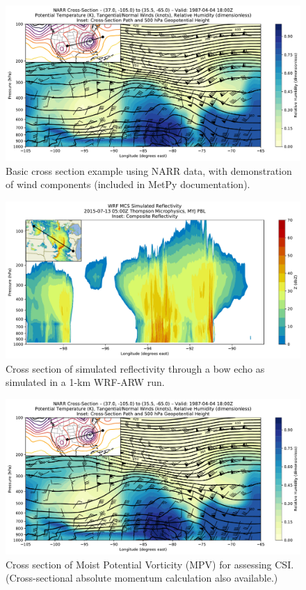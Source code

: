 \documentclass[final]{beamer}
\newlength{\colwidth}
\begin{document}
\begin{frame}[t, fragile]
\begin{columns}[t]
\begin{column}{\colwidth}
\begin{exampleblock}
    \begin{figure}
      \centering
      \includegraphics[width=\colwidth]{figures/basic_example_narr.pdf}
      \caption{Basic cross section example using NARR data, with demonstration of wind components (included in MetPy documentation).}
    \end{figure}
    \begin{figure}
      \centering
      \includegraphics[width=\colwidth]{figures/wrf_refl.pdf}
      \caption{Cross section of simulated reflectivity through a bow echo as simulated in a 1-km WRF-ARW run.}
    \end{figure}
    \begin{figure}
      \centering
      \includegraphics[width=\colwidth]{figures/basic_example_narr.pdf}
      \caption{Cross section of Moist Potential Vorticity (MPV) for assessing CSI. (Cross-sectional absolute momentum calculation also available.)}
    \end{figure}


\end{exampleblock}
\end{column}
\end{columns}
\end{frame}
\end{document}
